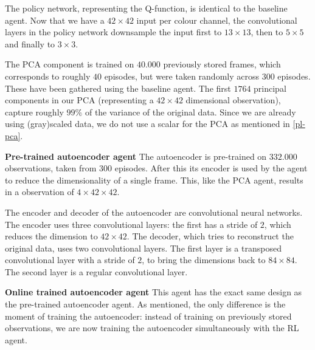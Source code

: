 The policy network, representing the Q-function, is identical to the baseline agent. Now that we have a $42 \times 42$ input per colour channel, the convolutional layers in the policy network downsample the input first to $13 \times 13$, then to $5 \times 5$ and finally to $3 \times 3$.

The PCA component is trained on $40.000$ previously stored frames, which corresponds to roughly $40$ episodes, but were taken randomly across $300$ episodes. These have been gathered using the baseline agent. The first $1764$ principal components in our PCA (representing a $42 \times 42$ dimensional observation), capture roughly $99\%$ of the variance of the original data. Since we are already using (gray)scaled data, we do not use a scalar for the PCA  as mentioned in \ref{pl-pca}. \newline

\noindent \textbf{Pre-trained autoencoder agent}\newline
\noindent The autoencoder is pre-trained on $332.000$ observations, taken from $300$ episodes. After this its encoder is used by the agent to reduce the dimensionality of a single frame. This, like the PCA agent, results in a observation of $4 \times 42 \times 42$.

The encoder and decoder of the autoencoder are convolutional neural networks. The encoder uses three convolutional layers: the first has a stride of $2$, which reduces the dimension to $42 \times 42$. The decoder, which tries to reconstruct the original data, uses two convolutional layers. The first layer is a transposed convolutional layer with a stride of $2$, to bring the dimensions back to $84 \times 84$. The second layer is a regular convolutional layer. \newline
 
\noindent \textbf{Online trained autoencoder agent}\newline
\noindent  This agent has the exact same design as the pre-trained autoencoder agent. As mentioned, the only difference is the moment of training the autoencoder: instead of training on previously stored observations, we are now training the autoencoder simultaneously with the RL agent.

